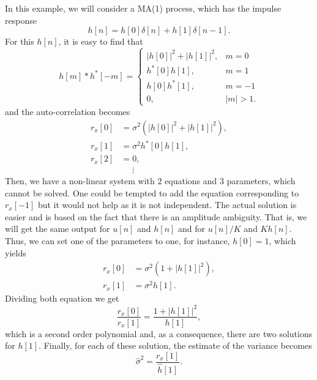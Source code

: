 \begin{example}
	
	In this example, we will consider a MA(1) process, which has the impulse response
	\begin{equation*}
	h[n] = h[0] \delta[n] + h[1] \delta[n-1].
	\end{equation*}
	For this $h[n]$, it is easy to find that
\begin{equation*}
h[m] \ast  h^{\ast}[-m] =
\begin{cases}
|h[0]|^2 + |h[1]|^2, & m = 0 \\
h^{\ast}[0] h[1], & m = 1 \\
h[0] h^{\ast}[1], & m = -1 \\
0, & |m| > 1.
\end{cases}
\end{equation*}
and the auto-correlation becomes
\begin{align*}
r_x[0] &= \sigma^2 \left(|h[0]|^2 + |h[1]|^2\right), \\
r_x[1] &= \sigma^2 h^{\ast}[0] h[1], \\
r_x[2] &= 0, \\
&\phantom{=} \vdots 
\end{align*}
Then, we have a non-linear system with $2$ equations and $3$ parameters, which cannot be solved. One could be tempted to add the equation corresponding to $r_x[-1]$ but it would not help as it is not independent. The actual solution is easier and is based on the fact that there is an amplitude ambiguity. That is, we will get the same output for $u[n]$ and $h[n]$ and for $u[n]/K$ and $K h[n]$. Thus, we can set one of the parameters to one, for instance, $h[0] = 1$, which yields
\begin{align*}
r_x[0] &= \sigma^2 \left(1 + |h[1]|^2\right), \\
r_x[1] &= \sigma^2 h[1].
\end{align*}
Dividing both equation we get
\begin{equation*}
\frac{r_x[0]}{r_x[1]} = \frac{1 + |h[1]|^2}{h[1]},
\end{equation*}
which is a second order polynomial and, as a consequence, there are two solutions for $h[1]$. Finally, for each of these solution, the estimate of the variance becomes
\begin{equation*}
\hat{\sigma}^2 = \frac{r_x[1]}{\hat{h}[1]}.
\end{equation*}

\end{example}